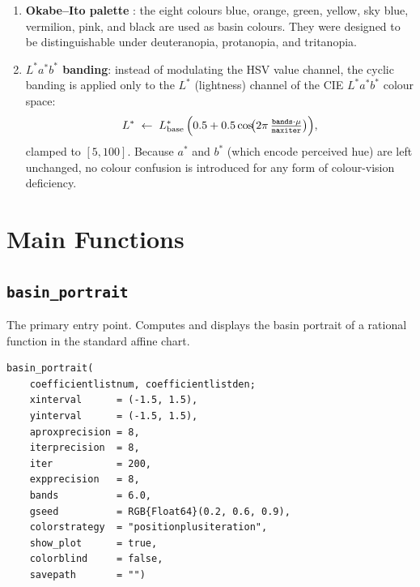 \documentclass[11pt,a4paper]{article}
\theoremstyle{definition}
\newcommand{\fn}[1]{\texttt{#1}}
\begin{document}
\begin{enumerate}
  \item \textbf{Okabe--Ito palette} \citep{okabe2008}: the eight colours
    \textcolor[RGB]{0,114,178}{blue}, \textcolor[RGB]{230,159,0}{orange},
    \textcolor[RGB]{0,158,115}{green}, \textcolor[RGB]{240,228,66}{yellow},
    \textcolor[RGB]{86,180,233}{sky blue}, \textcolor[RGB]{213,94,0}{vermilion},
    \textcolor[RGB]{204,121,167}{pink}, and black
    are used as basin colours.
    They were designed to be distinguishable under deuteranopia, protanopia,
    and tritanopia.

  \item \textbf{$L^*a^*b^*$ banding}: instead of modulating the HSV value
    channel, the cyclic banding is applied only to the $L^*$ (lightness)
    channel of the CIE $L^*a^*b^*$ colour space:
    \[
      L^* \;\leftarrow\; L^*_{\mathrm{base}}\,
        \Bigl(0.5 + 0.5\cos\!\bigl(2\pi\,
          \tfrac{\mathtt{bands}\cdot\mu}{\mathtt{maxiter}}\bigr)\Bigr),
    \]
    clamped to $[5, 100]$.
    Because $a^*$ and $b^*$ (which encode perceived hue) are left unchanged,
    no colour confusion is introduced for any form of colour-vision deficiency.
\end{enumerate}

\section{Main Functions}
\label{sec:main}

\subsection{\fn{basin\_portrait}}

The primary entry point.  Computes and displays the basin portrait of a
rational function in the standard affine chart.

\begin{lstlisting}
basin_portrait(
    coefficientlistnum, coefficientlistden;
    xinterval      = (-1.5, 1.5),
    yinterval      = (-1.5, 1.5),
    aproxprecision = 8,
    iterprecision  = 8,
    iter           = 200,
    expprecision   = 8,
    bands          = 6.0,
    gseed          = RGB{Float64}(0.2, 0.6, 0.9),
    colorstrategy  = "positionplusiteration",
    show_plot      = true,
    colorblind     = false,
    savepath       = "")
\end{lstlisting}
\end{document}
